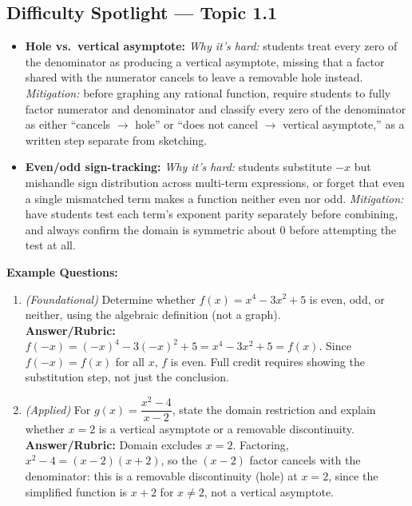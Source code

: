\documentclass{article}
\begin{document}
\subsection*{Difficulty Spotlight --- Topic 1.1}
\begin{itemize}[leftmargin=*]
  \item \textbf{Hole vs.\ vertical asymptote:} \textit{Why it's hard:} students treat every zero of the denominator as producing a vertical asymptote, missing that a factor shared with the numerator cancels to leave a removable hole instead. \textit{Mitigation:} before graphing any rational function, require students to fully factor numerator and denominator and classify every zero of the denominator as either ``cancels $\rightarrow$ hole'' or ``does not cancel $\rightarrow$ vertical asymptote,'' as a written step separate from sketching.
  \item \textbf{Even/odd sign-tracking:} \textit{Why it's hard:} students substitute $-x$ but mishandle sign distribution across multi-term expressions, or forget that even a single mismatched term makes a function neither even nor odd. \textit{Mitigation:} have students test each term's exponent parity separately before combining, and always confirm the domain is symmetric about $0$ before attempting the test at all.
\end{itemize}

\textbf{Example Questions:}
\begin{enumerate}[leftmargin=*]
  \item \textit{(Foundational)} Determine whether $f(x)=x^4-3x^2+5$ is even, odd, or neither, using the algebraic definition (not a graph). \\
  \textbf{Answer/Rubric:} $f(-x)=(-x)^4-3(-x)^2+5=x^4-3x^2+5=f(x)$. Since $f(-x)=f(x)$ for all $x$, $f$ is even. Full credit requires showing the substitution step, not just the conclusion.
  \item \textit{(Applied)} For $g(x)=\dfrac{x^2-4}{x-2}$, state the domain restriction and explain whether $x=2$ is a vertical asymptote or a removable discontinuity. \\
  \textbf{Answer/Rubric:} Domain excludes $x=2$. Factoring, $x^2-4=(x-2)(x+2)$, so the $(x-2)$ factor cancels with the denominator: this is a removable discontinuity (hole) at $x=2$, since the simplified function is $x+2$ for $x\neq2$, not a vertical asymptote.
\end{enumerate}
\end{document}
